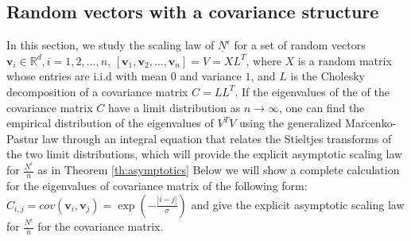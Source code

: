 \documentclass[11pt]{amsart}
\newcommand{\bv}{\mathbf{v}}
\begin{document}
\subsection{Random vectors with a covariance structure}
\label{sec:correlated}
In this section, we study the scaling law of $\underline{N}^{\epsilon}$ for a set of random vectors $\bv_i \in \mathbb{R}^d, i=1, 2, \ldots, n$,
$[\bv_1, \bv_2,\dots, \bv_n]=V=XL^T$, where $X$ is a random matrix whose entries are i.i.d with mean $0$ and variance $1$, and $L$ is the Cholesky decomposition of a covariance matrix $C=LL^T$.
 If the eigenvalues 
of the of the covariance matrix $C$ have a limit distribution as $n \rightarrow \infty$,  one can find the empirical distribution of the eigenvalues of $V^TV$ using the generalized Mar$\check{\text{c}}$enko-Pastur law \cite{silverstein1995empirical, silverstein1995strong} through an integral equation that relates the Stieltjes transforms of the two limit distributions, which will provide the explicit asymptotic scaling law for $\frac{\underline{N}^{\epsilon}}{n}$ as in Theorem \ref{th:asymptotics}
Below we will show a complete calculation for the eigenvalues of covariance matrix of the following form: $C_{i,j}=cov(\bv_i,\bv_j)=\exp(-\frac{|i-j|}{\sigma})$ and give the explicit asymptotic scaling law for $\frac{\underline{N}^{\epsilon}}{n}$ for the covariance matrix. %

\end{document}
